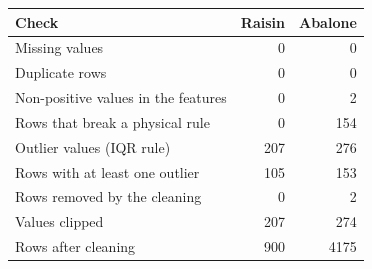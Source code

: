 \begin{tabular}{lrr}
\toprule
Check & Raisin & Abalone \\
\midrule
Missing values & 0 & 0 \\
Duplicate rows & 0 & 0 \\
Non-positive values in the features & 0 & 2 \\
Rows that break a physical rule & 0 & 154 \\
Outlier values (IQR rule) & 207 & 276 \\
Rows with at least one outlier & 105 & 153 \\
\midrule
Rows removed by the cleaning & 0 & 2 \\
Values clipped & 207 & 274 \\
Rows after cleaning & 900 & 4175 \\
\bottomrule
\end{tabular}
